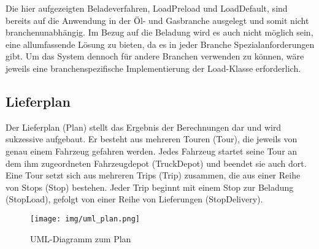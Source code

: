 \noindent
Die hier aufgezeigten Beladeverfahren, \textsf{LoadPreload} und \textsf{LoadDefault}, sind bereits auf die Anwendung in der Öl- und Gasbranche ausgelegt und somit nicht branchenunabhängig. Im Bezug auf die Beladung wird es auch nicht möglich sein, eine allumfassende Lösung zu bieten, da es in jeder Branche Spezialanforderungen gibt. Um das System dennoch für andere Branchen verwenden zu können, wäre jeweils eine branchenspezifische Implementierung der \textsf{Load}-Klasse erforderlich.


\subsection{Lieferplan}
Der Lieferplan (\textsf{Plan}) stellt das Ergebnis der Berechnungen dar und wird sukzessive aufgebaut. Er besteht aus mehreren Touren (\textsf{Tour}), die jeweils von genau einem Fahrzeug gefahren werden. Jedes Fahrzeug startet seine Tour an dem ihm zugeordneten Fahrzeugdepot (\textsf{TruckDepot}) und beendet sie auch dort. Eine Tour setzt sich aus mehreren Trips (\textsf{Trip}) zusammen, die aus einer Reihe von Stops (\textsf{Stop}) bestehen. Jeder Trip beginnt mit einem Stop zur Beladung (\textsf{StopLoad}), gefolgt von einer Reihe von Lieferungen (\textsf{StopDelivery}). \\

\begin{figure}[h]
  \centering
  \texttt{[image: img/uml\_plan.png]}
  \caption{UML-Diagramm zum Plan}
  \label{fig:uml_plan}
\end{figure}

